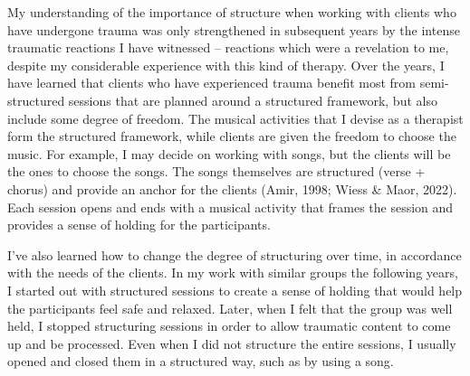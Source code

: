 \documentclass[authordate, empirical, issue]{jote-new-article}
\begin{document}
My understanding of the importance of structure when working with clients who have undergone trauma was only strengthened in subsequent years by the intense traumatic reactions I have witnessed -- reactions which were a revelation to me, despite my considerable experience with this kind of therapy. Over the years, I have learned that clients who have experienced trauma benefit most from semi-structured sessions that are planned around a structured framework, but also include some degree of freedom. The musical activities that I devise as a therapist form the structured framework, while clients are given the freedom to choose the music. For example, I may decide on working with songs, but the clients will be the ones to choose the songs. The songs themselves are structured (verse + chorus) and provide an anchor for the clients (Amir, 1998; Wiess \& Maor, 2022). Each session opens and ends with a musical activity that frames the session and provides a sense of holding for the participants.



I've also learned how to change the degree of structuring over time, in accordance with the needs of the clients. In my work with similar groups the following years, I started out with structured sessions to create a sense of holding that would help the participants feel safe and relaxed. Later, when I felt that the group was well held, I stopped structuring sessions in order to allow traumatic content to come up and be processed. Even when I did not structure the entire sessions, I usually opened and closed them in a structured way, such as by using a song.
\end{document}

